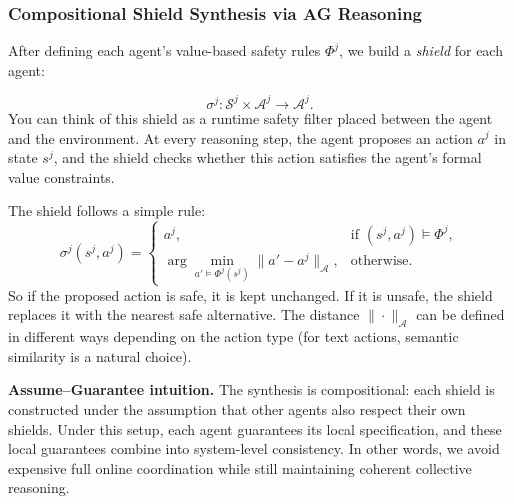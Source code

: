 \documentclass[12pt,a4paper]{article}
\newcommand{\calS}{\mathcal{S}}
\newcommand{\calA}{\mathcal{A}}
\begin{document}
\subsubsection{Compositional Shield Synthesis via AG Reasoning}

After defining each agent’s value-based safety rules $\Phi^j$, we build a
\emph{shield} for each agent:

\[
\sigma^j:\calS^j \times \calA^j \rightarrow \calA^j.
\]
You can think of this shield as a runtime safety filter placed between the agent and
the environment. At every reasoning step, the agent proposes an action $a^j$ in state
$s^j$, and the shield checks whether this action satisfies the agent’s formal value
constraints.

The shield follows a simple rule:
\begin{equation}
  \sigma^j(s^j, a^j)=
  \begin{cases}
    a^j, & \text{if } (s^j,a^j)\models \Phi^j,\\[4pt]
    \displaystyle\arg\min_{a' \models \Phi^j(s^j)} \|a'-a^j\|_{\calA},
    & \text{otherwise}.
  \end{cases}
  \label{eq:vacs_shield}
\end{equation}
So if the proposed action is safe, it is kept unchanged. If it is unsafe, the shield
replaces it with the nearest safe alternative. The distance $\|\cdot\|_{\calA}$ can be
defined in different ways depending on the action type (for text actions, semantic
similarity is a natural choice).

\vspace{4pt}
\noindent\textbf{Assume--Guarantee intuition.}
The synthesis is compositional: each shield is constructed under the assumption that
other agents also respect their own shields. Under this setup, each agent guarantees
its local specification, and these local guarantees combine into system-level
consistency. In other words, we avoid expensive full online coordination while still
maintaining coherent collective reasoning.

\vspace{6pt}
\end{document}
